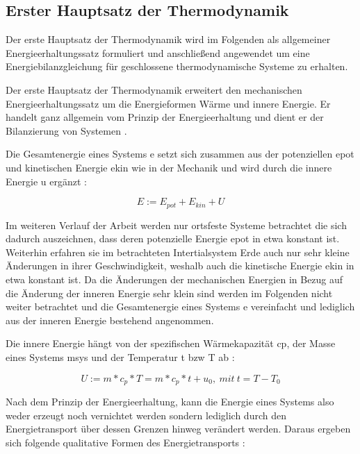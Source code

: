 \subsection{Erster Hauptsatz der Thermodynamik}
Der erste Hauptsatz der Thermodynamik wird im Folgenden als allgemeiner Energieerhaltungssatz formuliert und anschließend angewendet um eine Energiebilanzgleichung für geschlossene thermodynamische Systeme zu erhalten.

Der erste Hauptsatz der Thermodynamik erweitert den mechanischen Energieerhaltungssatz um die Energieformen Wärme und innere Energie. Er handelt ganz allgemein vom Prinzip der Energieerhaltung und  dient er der Bilanzierung von Systemen \cite[S.~43]{ba12}.

Die Gesamtenergie eines Systems \gls{e} setzt sich zusammen aus der potenziellen \gls{epot} und kinetischen Energie \gls{ekin} wie in der Mechanik und wird durch die innere Energie \gls{u} ergänzt \cite[S.~49]{ba12}:

\begin{equation}
\label{eq:energie}
E := E_{pot} + E_{kin} + U
\end{equation}

Im weiteren Verlauf der Arbeit werden nur ortsfeste Systeme betrachtet die sich dadurch auszeichnen, dass deren potenzielle Energie  \gls{epot} in etwa konstant ist. Weiterhin erfahren sie im betrachteten Intertialsystem Erde auch nur sehr kleine Änderungen in ihrer Geschwindigkeit, weshalb auch die kinetische Energie \gls{ekin} in etwa konstant ist.  Da die Änderungen der mechanischen Energien in Bezug auf die Änderung der inneren Energie sehr klein sind werden im Folgenden nicht weiter betrachtet und die Gesamtenergie eines Systems \gls{e} vereinfacht und lediglich aus der inneren Energie bestehend angenommen.

Die innere Energie hängt von der spezifischen Wärmekapazität \gls{cp}, der Masse eines Systems \gls{msys} und der Temperatur \gls{t} \acrlong{bzw} \gls{T} ab \cite[S.~54]{ba12}:

\begin{equation}
\label{eq:innereenergie}
U := m*c_p*T=m*c_p*t+u_0,~mit~t=T-T_0
\end{equation}

Nach dem Prinzip der Energieerhaltung, kann die Energie eines Systems also weder erzeugt noch vernichtet werden sondern lediglich durch den Energietransport über dessen Grenzen hinweg verändert werden. Daraus ergeben sich folgende qualitative Formen des Energietransports \cite[S.~48f.]{ba12}:

